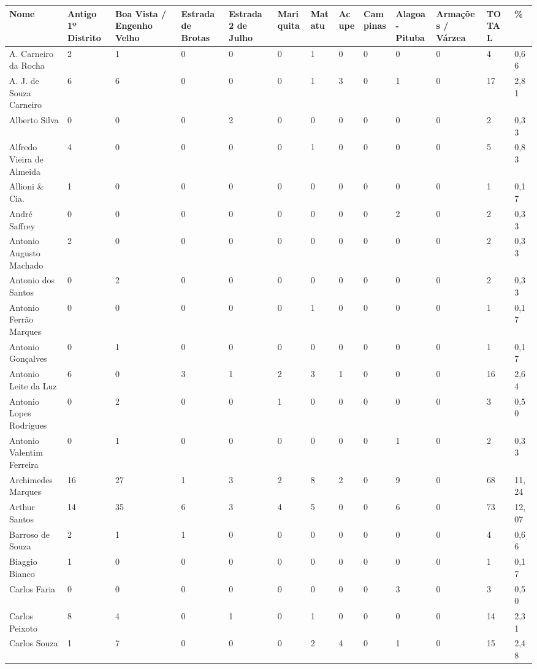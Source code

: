 \begin{table}[!htp]
{
\begin{tiny}
\begin{tabular}{lllllllllllll}
\toprule
Nome	&Antigo 1º Distrito	&Boa Vista / Engenho Velho	&Estrada de Brotas	&Estrada 2 de Julho	&Mariquita	&Matatu	&Acupe	&Campinas	&Alagoa-Pituba	&Armações / Várzea	&TOTAL	&\%\\
\midrule
\midrule
A. Carneiro da Rocha	&2	&1	&0	&0	&0	&1	&0	&0	&0	&0	&4	&0,66\\
A. J. de Souza Carneiro	&6	&6	&0	&0	&0	&1	&3	&0	&1	&0	&17	&2,81\\
Alberto Silva	&0	&0	&0	&2	&0	&0	&0	&0	&0	&0	&2	&0,33\\
Alfredo Vieira de Almeida	&4	&0	&0	&0	&0	&1	&0	&0	&0	&0	&5	&0,83\\
Allioni \& Cia.	&1	&0	&0	&0	&0	&0	&0	&0	&0	&0	&1	&0,17\\
André Saffrey	&0	&0	&0	&0	&0	&0	&0	&0	&2	&0	&2	&0,33\\
Antonio Augusto Machado	&2	&0	&0	&0	&0	&0	&0	&0	&0	&0	&2	&0,33\\
Antonio dos Santos	&0	&2	&0	&0	&0	&0	&0	&0	&0	&0	&2	&0,33\\
Antonio Ferrão Marques	&0	&0	&0	&0	&0	&1	&0	&0	&0	&0	&1	&0,17\\
Antonio Gonçalves	&0	&1	&0	&0	&0	&0	&0	&0	&0	&0	&1	&0,17\\
Antonio Leite da Luz	&6	&0	&3	&1	&2	&3	&1	&0	&0	&0	&16	&2,64\\
Antonio Lopes Rodrigues	&0	&2	&0	&0	&1	&0	&0	&0	&0	&0	&3	&0,50\\
Antonio Valentim Ferreira	&0	&1	&0	&0	&0	&0	&0	&0	&1	&0	&2	&0,33\\
Archimedes Marques	&16	&27	&1	&3	&2	&8	&2	&0	&9	&0	&68	&11,24\\
Arthur Santos	&14	&35	&6	&3	&4	&5	&0	&0	&6	&0	&73	&12,07\\
Barroso de Souza	&2	&1	&1	&0	&0	&0	&0	&0	&0	&0	&4	&0,66\\
Biaggio Bianco	&1	&0	&0	&0	&0	&0	&0	&0	&0	&0	&1	&0,17\\
Carlos Faria	&0	&0	&0	&0	&0	&0	&0	&0	&3	&0	&3	&0,50\\
Carlos Peixoto	&8	&4	&0	&1	&0	&1	&0	&0	&0	&0	&14	&2,31\\
Carlos Souza	&1	&7	&0	&0	&0	&2	&4	&0	&1	&0	&15	&2,48\\

\end{tabular}
\end{tiny}}
\end{table}
